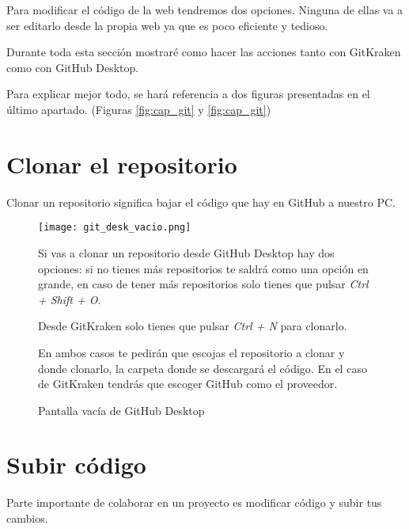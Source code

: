 \pagestyle{fancy}


Para modificar el código de la web tendremos dos opciones. Ninguna de ellas va a ser editarlo desde la propia web ya que es poco eficiente y tedioso.

Durante toda esta sección mostraré como hacer las acciones tanto con GitKraken como con GitHub Desktop.

Para explicar mejor todo, se hará referencia a dos figuras presentadas en el último apartado. (Figuras \ref{fig:cap_git} y \ref{fig:cap_git})

\section{Clonar el repositorio}

Clonar un repositorio significa bajar el código que hay en GitHub a nuestro PC.

\begin{figure}[ht]
    \begin{minipage}{0.4\linewidth}
        \centering
        \texttt{[image: git\_desk\_vacio.png]}
        \caption{Pantalla vacía de GitHub Desktop}
        \label{fig:cap_vacia}
    \end{minipage}%
    \begin{minipage}[b]{0.6\linewidth}
        \setlength{\parindent}{0.2in}

        Si vas a clonar un repositorio desde GitHub Desktop hay dos opciones: si no tienes más repositorios te saldrá como una opción en grande, en caso de tener más repositorios solo tienes que pulsar \textit{Ctrl + Shift + O}.

        Desde GitKraken solo tienes que pulsar \textit{Ctrl + N} para clonarlo.

        En ambos casos te pedirán que escojas el repositorio a clonar y donde clonarlo, la carpeta donde se descargará el código. En el caso de GitKraken tendrás que escoger GitHub como el proveedor.

    \end{minipage}
\end{figure}

\section{Subir código}

Parte importante de colaborar en un proyecto es modificar código y subir tus cambios.

